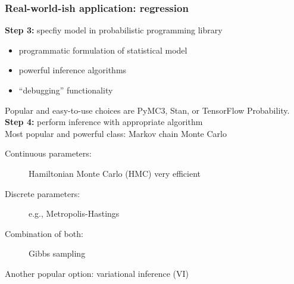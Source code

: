 \documentclass[t,aspectratio=169]{beamer}
\begin{document}
\begin{frame}
  \frametitle{Real-world-ish application: regression}
  \textbf{Step 3:} specfiy model in probabilistic programming library\\
  \begin{itemize}
  \item programmatic formulation of statistical model
  \item powerful inference algorithms
  \item ``debugging'' functionality
  \end{itemize}
  Popular and easy-to-use choices are PyMC3, Stan, or TensorFlow Probability.
  \bigskip\\
  \textbf{Step 4:} perform inference with appropriate algorithm\\
  Most popular and powerful class: Markov chain Monte Carlo
  \begin{description}
  \item[Continuous parameters:] Hamiltonian Monte Carlo (HMC) very efficient\\
  \item[Discrete parameters:] e.g., Metropolis-Hastings\\
  \item[Combination of both:] Gibbs sampling
  \end{description}
  Another popular option: variational inference (VI)
\end{frame}
\end{document}
